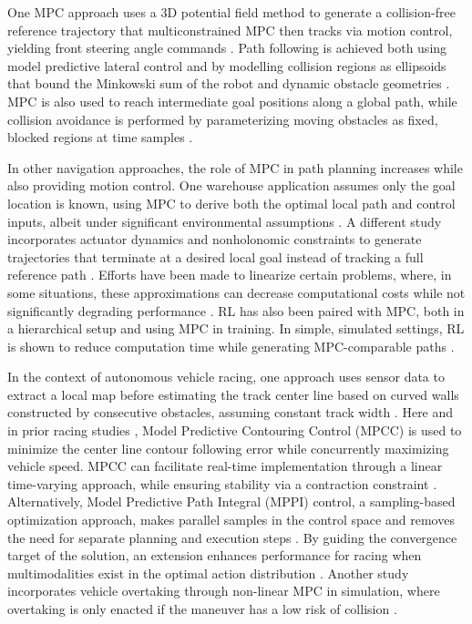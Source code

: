 \documentclass[journal]{IEEEtran}
\begin{document}
One MPC approach uses a 3D potential field method to generate a collision-free reference trajectory that multiconstrained MPC then tracks via motion control, yielding front steering angle commands \cite{Ji2017}. Path following is achieved both using model predictive lateral control \cite{Gao22} and by modelling collision regions as ellipsoids that bound the Minkowski sum of the robot and dynamic obstacle geometries \cite{Brito19}. MPC is also used to reach intermediate goal positions along a global path, while collision avoidance is performed by parameterizing moving obstacles as fixed, blocked regions at time samples \cite{MPC_Planner}.

In other navigation approaches, the role of MPC in path planning increases while also providing motion control. One warehouse application assumes only the goal location is known, using MPC to derive both the optimal local path and control inputs, albeit under significant environmental assumptions \cite{Ishihara2022}. A different study incorporates actuator dynamics and nonholonomic constraints to generate trajectories that terminate at a desired local goal instead of tracking a full reference path \cite{Babu2019}. Efforts have been made to linearize certain problems, where, in some situations, these approximations can decrease computational costs while not significantly degrading performance \cite{Alcal2019}. RL has also been paired with MPC, both in a hierarchical setup \cite{Fehr2025} and using MPC in training. In simple, simulated settings, RL is shown to reduce computation time while generating MPC-comparable paths \cite{Kim2022}.

In the context of autonomous vehicle racing, one approach uses sensor data to extract a local map before estimating the track center line based on curved walls constructed by consecutive obstacles, assuming constant track width \cite{Evans24}. Here and in prior racing studies \cite{Liniger17}, Model Predictive Contouring Control (MPCC) is used to minimize the center line contour following error while concurrently maximizing vehicle speed. MPCC can facilitate real-time implementation through a linear time-varying approach, while ensuring stability via a contraction constraint \cite{Lam2010}. Alternatively, Model Predictive Path Integral (MPPI) control, a sampling-based optimization approach, makes parallel samples in the control space and removes the need for separate planning and execution steps \cite{Williams2016}. By guiding the convergence target of the solution, an extension enhances performance for racing when multimodalities exist in the optimal action distribution \cite{Honda23}. Another study incorporates vehicle overtaking through non-linear MPC in simulation, where overtaking is only enacted if the maneuver has a low risk of collision \cite{Buyval2017}.
\end{document}
